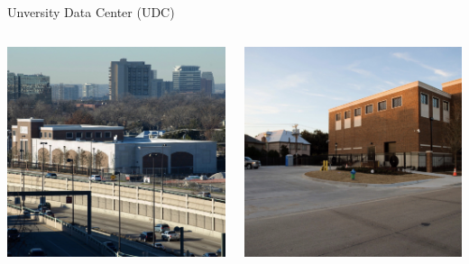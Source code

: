 \begin{frame}{Unversity Data Center (UDC)}
\begin{columns}
\begin{column}{0.5\textwidth}
\begin{center}
\includegraphics[width=\textwidth]{figures/udc_1.jpg}
\end{center}
\end{column}
\begin{column}{0.5\textwidth}
\begin{center}
\includegraphics[width=\textwidth]{figures/udc_2.jpg}
\end{center}
\end{column}
\end{columns}
\end{frame}

